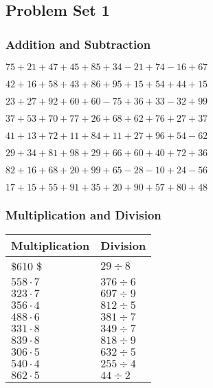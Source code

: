 \hypertarget{problem-set-1}{%
\subsection{Problem Set 1}\label{problem-set-1}}

\hypertarget{addition-and-subtraction}{%
\subsubsection{Addition and
Subtraction}\label{addition-and-subtraction}}

\(75+21+47+45+85+34-21+74-16+67\)

\(42+16+58+43+86+95+15+54+44+15\)

\(23+27+92+60+60-75+36+33-32+99\)

\(37+53+70+77+26+68+62+76+27+37\)

\(41+13+72+11+84+11+27+96+54-62\)

\(29+34+81+98+29+66+60+40+72+36\)

\(82+16+68+20+99+65-28-10+24-56\)

\(17+15+55+91+35+20+90+57+80+48\)

\hypertarget{multiplication-and-division}{%
\subsubsection{Multiplication and
Division}\label{multiplication-and-division}}

\begin{longtable}[]{@{}ll@{}}
\toprule
Multiplication & Division\tabularnewline
\midrule
\endhead
\$610\cdot8 \$ & \(29÷8\)\tabularnewline
\(558\cdot7\) & \(376÷6\)\tabularnewline
\(323\cdot7\) & \(697÷9\)\tabularnewline
\(356\cdot4\) & \(812÷5\)\tabularnewline
\(488\cdot6\) & \(381÷7\)\tabularnewline
\(331\cdot8\) & \(349÷7\)\tabularnewline
\(839\cdot8\) & \(818÷9\)\tabularnewline
\(306\cdot5\) & \(632÷5\)\tabularnewline
\(540\cdot4\) & \(255÷4\)\tabularnewline
\(862\cdot5\) & \(44÷2\)\tabularnewline
\bottomrule
\end{longtable}

